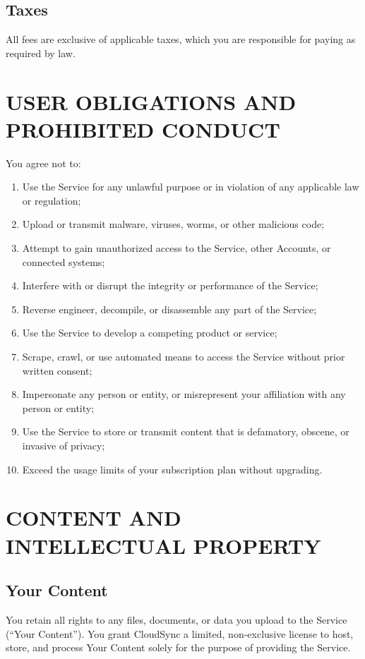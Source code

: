 \documentclass[
    language=english,
    doctype=terms-of-service,
    institution=none,
]{../../omnilatex}
\begin{document}
\subsection{Taxes}
All fees are exclusive of applicable taxes, which you are responsible for paying as required by law.

\section{USER OBLIGATIONS AND PROHIBITED CONDUCT}

You agree not to:
\begin{enumerate}
    \item Use the Service for any unlawful purpose or in violation of any applicable law or regulation;
    \item Upload or transmit malware, viruses, worms, or other malicious code;
    \item Attempt to gain unauthorized access to the Service, other Accounts, or connected systems;
    \item Interfere with or disrupt the integrity or performance of the Service;
    \item Reverse engineer, decompile, or disassemble any part of the Service;
    \item Use the Service to develop a competing product or service;
    \item Scrape, crawl, or use automated means to access the Service without prior written consent;
    \item Impersonate any person or entity, or misrepresent your affiliation with any person or entity;
    \item Use the Service to store or transmit content that is defamatory, obscene, or invasive of privacy;
    \item Exceed the usage limits of your subscription plan without upgrading.
\end{enumerate}

\section{CONTENT AND INTELLECTUAL PROPERTY}

\subsection{Your Content}
You retain all rights to any files, documents, or data you upload to the Service (``Your Content''). You grant CloudSync a limited, non-exclusive license to host, store, and process Your Content solely for the purpose of providing the Service.
\end{document}
